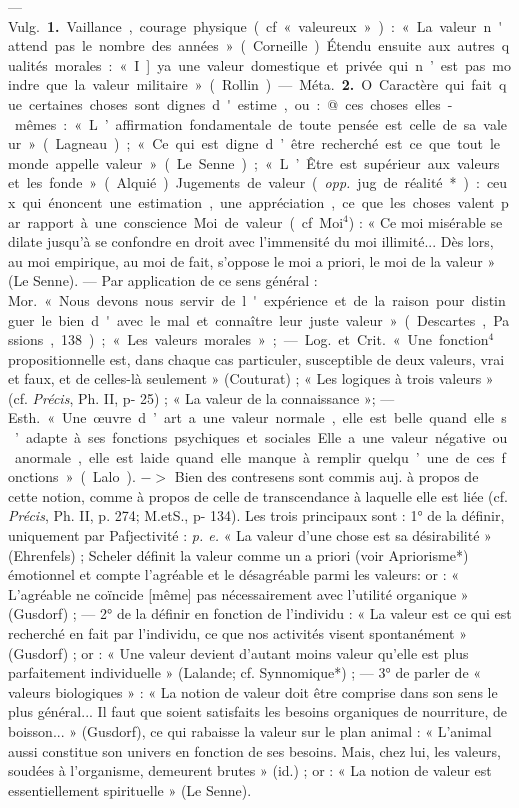 
	\begin{itemize}[leftmargin=1cm, label=, itemsep=1pt]

 — \si{Vulg.} {\bf 1.} Vaillance, courage
physique (cf. « valeureux ») : « La
valeur n'attend pas le nombre des
années » (Corneille). Étendu ensuite
aux autres qualités morales : « I] ya
une valeur domestique et privée
qui n’est pas moindre que la valeur
militaire » (Rollin).

— \si{Méta.}  {\bf 2.} O. Caractère qui fait
que certaines choses sont dignes
d'estime, ou : @ ces choses elles-mêmes : « L’affirmation fondamentale de toute pensée est celle de sa
valeur » (Lagneau) ; « Ce qui est
digne d’être recherché est ce que
tout le monde appelle valeur »
(Le Senne) ; « L’Être est supérieur
aux valeurs et les fonde » (Alquié).
Jugements de valeur ({\it opp.} jug. de
réalité*) : ceux qui énoncent une
estimation, une appréciation, ce que
les choses valent par rapport à une
conscience. Moi de valeur (cf. Moi$^4$) :
« Ce moi misérable se dilate jusqu’à
se confondre en droit avec l’immensité du moi illimité... Dès lors, au
moi empirique, au moi de fait, s’oppose le moi a priori, le moi de la
valeur » (Le Senne). — Par application de ce sens général : \si{Mor.} « Nous
devons nous servir de l'expérience
et de la raison pour distinguer le
bien d'avec le mal et connaître leur
juste valeur » (Descartes, Passions,
138) ; « Les valeurs morales »; —
\si{Log.} et \si{Crit.} « Une fonction$^4$ propositionnelle est, dans chaque cas particuler, susceptible de deux valeurs,
vrai et faux, et de celles-là seulement » (Couturat) ; « Les logiques à
trois valeurs » (cf. {\it Précis}, Ph. II,
p- 25) ; « La valeur de la connaissance »; — \si{Esth.} « Une œuvre d’art
a une valeur normale, elle est belle
quand elle s’adapte à ses fonctions
psychiques et sociales... Elle a une
valeur négative ou anormale, elle
est laide quand elle manque à remplir quelqu’une de ces fonctions »
(Lalo). $->$ Bien des contresens
sont commis auj. à propos de cette
notion, comme à propos de celle de
transcendance à laquelle elle est liée
(cf. {\it Précis}, Ph. II, p. 274; M.etS.,
p- 134). Les trois principaux sont :
1° de la définir, uniquement par
Pafjectivité : {\it p. e.} « La valeur d’une
chose est sa désirabilité » (Ehrenfels) ; Scheler définit la valeur comme
un a priori (voir Apriorisme*) émotionnel et compte l’agréable et le
désagréable parmi les valeurs: or :
« L’agréable ne coïncide [même] pas
nécessairement avec l'utilité organique » (Gusdorf) ; — 2° de la définir
en fonction de l'individu : « La
valeur est ce qui est recherché en
fait par l'individu, ce que nos activités visent spontanément » (Gusdorf) ; or : « Une valeur devient
d'autant moins valeur qu’elle est
plus parfaitement individuelle »
(Lalande; cf. Synnomique*) ; —
3° de parler de « valeurs biologiques » : « La notion de valeur doit
être comprise dans son sens le plus
général... Il faut que soient satisfaits les besoins organiques de nourriture, de boisson... » (Gusdorf), ce
qui rabaisse la valeur sur le plan
animal : « L'animal aussi constitue
son univers en fonction de ses besoins. Mais, chez lui, les valeurs,
soudées à l'organisme, demeurent
brutes » (id.) ; or : « La notion de
valeur est essentiellement spirituelle » (Le Senne).


\end{itemize}
